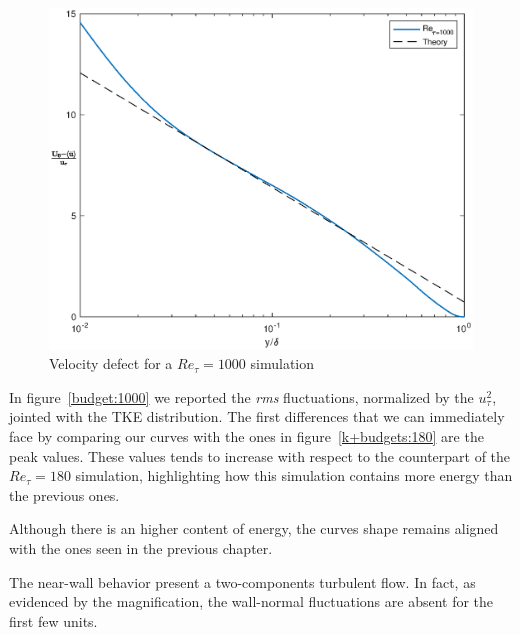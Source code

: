 \begin{figure}
\begin{center}
\includegraphics[scale=0.55]{grafici/velocity_defect_1000.eps}
\caption{Velocity defect for a $Re_{\tau}=1000$ simulation}
\label{velocity:defect:1000}
\end{center} 
\end{figure}

In figure~\ref{budget:1000} we reported the \emph{rms} fluctuations, normalized by the $u_{\tau}^{2}$, jointed with the TKE distribution. The first differences that we can immediately face by comparing our curves with the ones in figure~\ref{k+budgets:180} are the peak values. These values tends to increase with respect to the counterpart of the $Re_{\tau}=180$ simulation, highlighting how this simulation contains more energy than the previous ones.\par
Although there is an higher content of energy, the curves shape remains aligned with the ones seen in the previous chapter.\par
The near-wall behavior present a two-components turbulent flow. In fact, as evidenced by the magnification, the wall-normal fluctuations are absent for the first few units.
\\~\par

